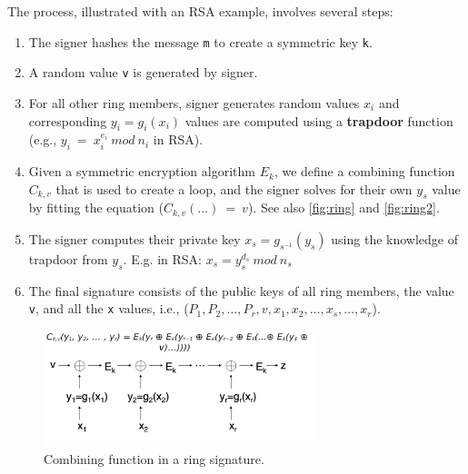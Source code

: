 The process, illustrated with an RSA example, involves several steps: 
\begin{enumerate}
	\item The signer hashes the message \texttt{m} to create a symmetric key
	\texttt{k}.
	
	\item A random value \texttt{v} is generated by signer. 
	
	\item  For all other ring members, signer generates random values \texttt{$x_i$} and corresponding
	$y_i = g_i(x_i)$ values are computed using a \textbf{trapdoor} function (e.g.,
	$y_i\ =\ x_i^{e_i}\ mod\ n_i$ in RSA). 
	
	\item  Given a symmetric encryption algorithm $E_k$, we define a combining function
	$C_{k,v}$ that is used to create a loop, and the signer solves for their
	own $y_s$ value by fitting the equation 
	($C_{k,v}(...)\ =\ v$).  
	See also \autoref{fig:ring} and \autoref{fig:ring2}. 
	
	\item The signer computes their private key  $x_s = g_{s^{-1}}(y_s)$ using the knowledge of trapdoor from $y_s$. 
	E.g. in RSA: $x_s = y_{s}^{d_s}\ mod\ n_s$ 
	 
	 \item  The final signature consists of the public keys of all ring members, the value \texttt{v}, and all the \texttt{x} values, i.e., ($P_1, P_2, \ldots, P_r, v, x_1, x_2, \ldots, x_s, \ldots, x_r$). 
	
\end{enumerate}


\begin{figure}[t]
	\begin{center}
		\includegraphics[width=0.7\textwidth]{./figs/ring-sig.png}
		\caption{Combining function in a ring signature.}		
		\label{fig:ring}
	\end{center}	
\end{figure}


